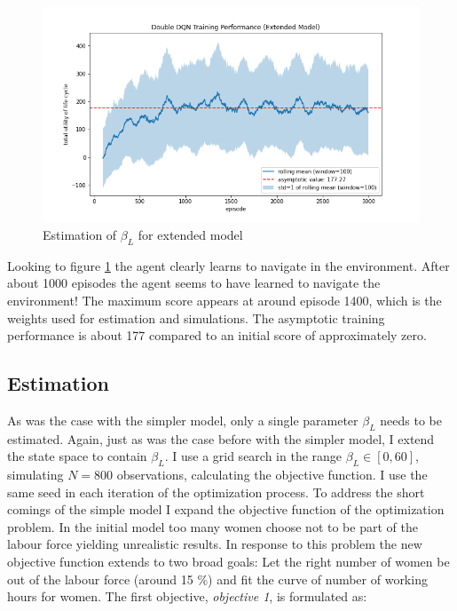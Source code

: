 \begin{figure}[ht]
    \centering
    \includegraphics[scale=0.4]{figures/ddqn_extended_model_training_performance.png}
    \caption{Estimation of $\beta_L$ for extended model}
    \label{fig:training_extended}
\end{figure}

Looking to figure \ref{fig:training_extended} the agent clearly learns to navigate in the environment. After about 1000 episodes the agent seems to have learned to navigate the environment! The maximum score appears at around episode 1400, which is the weights used for estimation and simulations. The asymptotic training performance is about 177 compared to an initial score of approximately zero.

\subsection{Estimation}

As was the case with the simpler model, only a single parameter $\beta_L$ needs to be estimated. Again, just as was the case before with the simpler model, I extend the state space to contain $\beta_L$. I use a grid search in the range $\beta_L \in [0, 60]$, simulating $N=800$ observations, calculating the objective function. I use the same seed in each iteration of the optimization process. To address the short comings of the simple model I expand the objective function of the optimization problem. In the initial model too many women choose not to be part of the labour force yielding unrealistic results. In response to this problem the new objective function extends to two broad goals: Let the right number of women be out of the labour force (around 15 \%) and fit the curve of number of working hours for women. The first objective, \textit{objective 1}, is formulated as: 

